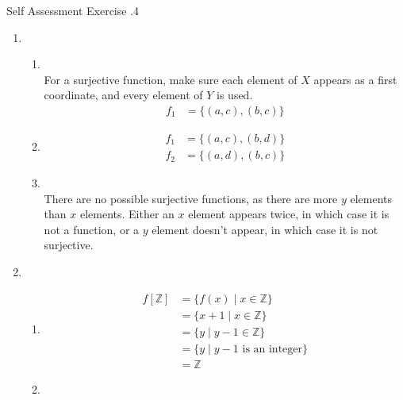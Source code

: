 \documentclass[../notes.tex]{subfiles}
\begin{document}
			\begin{exercise}{Self Assessment Exercise \thechapter.4}
				\begin{enumerate}
					\item {}
						\begin{enumerate}[label=(\alph*)]
							\item {}\\
								For a surjective function, make sure each element of $X$ appears as a first coordinate, and every element of $Y$ is used.
								\begin{align*}
									f_{1} &= \bigl\{(a, c), (b, c)\bigr\}
								\end{align*}
							\item {}
								\begin{align*}
									f_{1} &= \bigl\{(a, c), (b, d)\bigr\}\\
									f_{2} &= \bigl\{(a, d), (b, c)\bigr\}
								\end{align*}
							\item {}\\
								There are no possible surjective functions, as there are more $y$ elements than $x$ elements. Either an $x$ element appears twice, in which case it is not a function, or a $y$ element doesn't appear, in which case it is not surjective.
						\end{enumerate}
					\item {}
						\begin{enumerate}[label=(\alph*)]
							\item {}
								\begin{align*}
									f[\mathbb{Z}] &= \{f(x) \mid x \in \mathbb{Z}\}\\
									&= \{x + 1 \mid x \in \mathbb{Z}\} \tag*{$(y = x + 1 \Rightarrow x = y - 1)$}\\
									&= \{y \mid y - 1 \in \mathbb{Z}\}\\
									&= \{y \mid y - 1 \text{ is an integer}\}\\
									&= \mathbb{Z}
								\end{align*}
							\item {}\\

\end{enumerate}
\end{enumerate}
\end{exercise}
\end{document}
